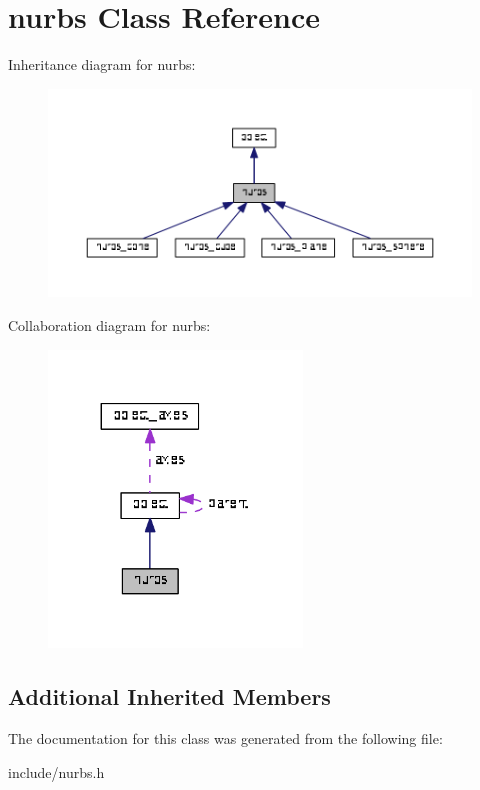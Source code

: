 \hypertarget{classnurbs}{}\section{nurbs Class Reference}
\label{classnurbs}


Inheritance diagram for nurbs\+:\nopagebreak
\begin{figure}[H]
\begin{center}
\leavevmode
\includegraphics[width=350pt]{classnurbs__inherit__graph}
\end{center}
\end{figure}


Collaboration diagram for nurbs\+:\nopagebreak
\begin{figure}[H]
\begin{center}
\leavevmode
\includegraphics[width=191pt]{classnurbs__coll__graph}
\end{center}
\end{figure}
\subsection*{Additional Inherited Members}


The documentation for this class was generated from the following file\+:\begin{DoxyCompactItemize}
\item 
include/nurbs.\+h\end{DoxyCompactItemize}
